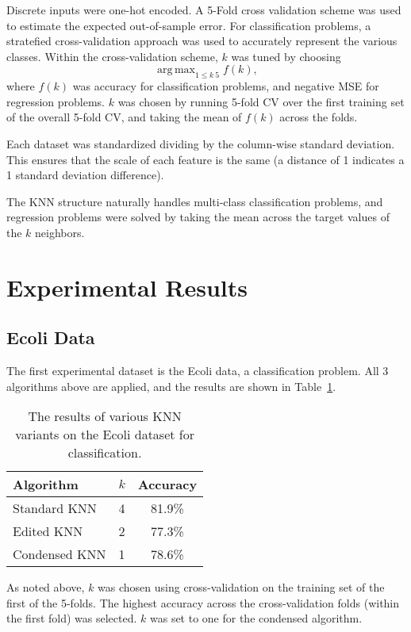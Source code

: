 \documentclass{amsart}
\DeclareMathOperator*{\argmax}{arg\,max}
\begin{document}
    Discrete inputs were one-hot encoded. A 5-Fold cross validation scheme was used to estimate the expected out-of-sample
    error. For classification problems, a stratefied cross-validation approach was used to accurately
    represent the various classes. Within the cross-validation scheme, $k$ was tuned by choosing
    \[
        \argmax_{1 \leq k \ 5} f(k),
    \]
    where $f(k)$ was accuracy for classification problems, and negative MSE for regression problems. $k$ was chosen
    by running 5-fold CV over the first training set of the overall 5-fold CV, and taking the mean of $f(k)$ across the
    folds.

    Each dataset was standardized dividing by the column-wise standard deviation. This
    ensures that the scale of each feature is the same (a distance of 1 indicates a 1
    standard deviation difference).

    The KNN structure naturally handles multi-class classification problems, and regression
    problems were solved by taking the mean across the target values of the $k$ neighbors.

    \section{Experimental Results}
    \subsection*{Ecoli Data}
    The first experimental dataset is the Ecoli data, a classification problem. All 3 algorithms above are applied,
    and the results are shown in Table~\ref{ecoli_results}.

    \begin{table}[H]
    \begin{tabular}{lcc}
        Algorithm     & $k$ & Accuracy \\
        \hline
        Standard KNN  & 4 & 81.9\% \\
        Edited KNN    & 2 & 77.3\% \\
        Condensed KNN & 1 & 78.6\% \\
    \end{tabular}
    \label{ecoli_results}
    \caption{The results of various KNN variants on the Ecoli dataset for classification.}
    \end{table}
    As noted above, $k$ was chosen using cross-validation on the training set of the first of the 5-folds. The highest
    accuracy across the cross-validation folds (within the first fold) was selected. $k$ was set to one for the
    condensed algorithm.
\end{document}
